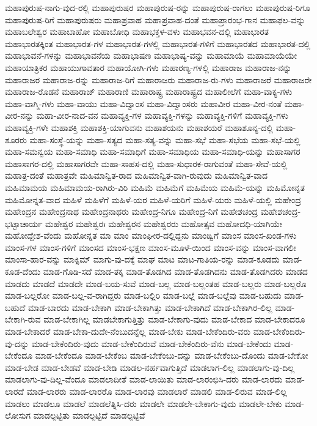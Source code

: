 {ಮಹಾಪುರುಷ-ನಾಗು-ವುದ-ರಲ್ಲಿ
ಮಹಾಪುರುಷರ
ಮಹಾಪುರುಷ-ರನ್ನು
ಮಹಾಪುರುಷ-ರಾಗಲು
ಮಹಾಪುರುಷ-ರಿಗೂ
ಮಹಾಪುರುಷ-ರಿಗೆ
ಮಹಾಪುರುಷರು
ಮಹಾಪ್ರವಾಹ
ಮಹಾಪ್ರವಾಹ-ದಂತೆ
ಮಹಾಪ್ರಾರಂಭ-ಗಾನ
ಮಹಾಫಲ-ವನ್ನು
ಮಹಾಬಲೇಶ್ವರ
ಮಹಾಬಾಹೋ
ಮಹಾಬೋಧಿ
ಮಹಾಭಕ್ತಳ-ವಳು
ಮಹಾಭವನ-ದಲ್ಲಿ
ಮಹಾಭಾರತ
ಮಹಾಭಾರತಕ್ಕಿಂತ
ಮಹಾಭಾರತ-ಗಳ
ಮಹಾಭಾರತ-ಗಳಲ್ಲಿ
ಮಹಾಭಾರತ-ಗಳಿಗೆ
ಮಹಾಭಾರತದ
ಮಹಾಭಾರತ-ದಲ್ಲಿ
ಮಹಾಭಾವನೆ-ಗಳನ್ನು
ಮಹಾಭಾವನೆಯ
ಮಹಾಭಾಷಣ
ಮಹಾಭಾಷ್ಯ-ವನ್ನು
ಮಹಾಮಾಯೆ
ಮಹಾಮಾಯೆಯೇ
ಮಹಾಯಾತ್ರಿಕರ
ಮಹಾಯುಗಾವತಾರ
ಮಹಾಯೋಗಿ-ಗಳು
ಮಹಾರಣ್ಯ-ಗಳಲ್ಲಿ
ಮಹಾರಾಜ
ಮಹಾರಾಜ-ನನ್ನು
ಮಹಾರಾಜರ
ಮಹಾರಾಜ-ರನ್ನು
ಮಹಾರಾಜ-ರಿಗೆ
ಮಹಾರಾಜರು
ಮಹಾರಾಜ-ರು-ಗಳು
ಮಹಾರಾಜರೆ
ಮಹಾರಾಜರೇ
ಮಹಾರಾಜ-ರೊಡನೆ
ಮಹಾರಾಜ್
ಮಹಾರಾಣಿ
ಮಹಾರಾಷ್ಟ್ರ
ಮಹಾರಾಷ್ಟ್ರದ
ಮಹಾಲೀಲೆಗೆ
ಮಹಾ-ವಾಕ್ಯ-ಗಳು
ಮಹಾ-ವಾಗ್ಮಿ-ಗಳು
ಮಹಾ-ವಾಯು
ಮಹಾ-ವಿದ್ವಾಂಸ
ಮಹಾ-ವಿದ್ವಾಂಸರು
ಮಹಾವೀರ
ಮಹಾ-ವೀರ-ನಂತೆ
ಮಹಾ-ವೀರ-ನನ್ನು
ಮಹಾ-ವೀರ-ನಾದ-ವನ
ಮಹಾವ್ಯಕ್ತಿ-ಗಳ
ಮಹಾವ್ಯಕ್ತಿ-ಗಳನ್ನು
ಮಹಾವ್ಯಕ್ತಿ-ಗಳಿಗೆ
ಮಹಾವ್ಯಕ್ತಿ-ಗಳು
ಮಹಾವ್ಯಕ್ತಿ-ಗಳೇ
ಮಹಾಶಕ್ತಿ
ಮಹಾಶಕ್ತಿ-ಯಾಗುವನು
ಮಹಾಶಯನು
ಮಹಾಶಯರೆ
ಮಹಾಶೂನ್ಯ-ದಲ್ಲಿ
ಮಹಾ-ಶೂರರು
ಮಹಾ-ಸಂಸ್ಥೆ-ಯನ್ನು
ಮಹಾ-ಸತ್ಯದ
ಮಹಾ-ಸತ್ಯ-ವನ್ನು
ಮಹಾ-ಸಭೆ
ಮಹಾ-ಸಭೆಯ
ಮಹಾ-ಸಭೆ-ಯಲ್ಲಿ
ಮಹಾ-ಸಮನ್ವಯ
ಮಹಾ-ಸಮಾಧಿ
ಮಹಾ-ಸಮಾಧಿಗೆ
ಮಹಾ-ಸಮಾಧಿಯ
ಮಹಾ-ಸಮಾಧಿ-ಯನ್ನು
ಮಹಾಸಾಗರ
ಮಹಾಸಾಗರ-ದಲ್ಲಿ
ಮಹಾಸಾಗರವೇ
ಮಹಾ-ಸಾಹಸ-ದಲ್ಲಿ
ಮಹಾ-ಸುಧಾರಕ-ರಾಗುವಂತೆ
ಮಹಾ-ಸೇವೆ-ಯಲ್ಲಿ
ಮಹಾತ್ರ-ದಂತೆ
ಮಹಾತ್ರವೇ
ಮಹಿಮಾನ್ವಿತ-ರಾದ
ಮಹಿಮಾನ್ವಿತ-ವಾಗಿ-ರುವುದು
ಮಹಿಮಾನ್ವಿತ-ವಾದ
ಮಹಿಮಾಮಯ
ಮಹಿಮಾಮಯ-ರಾಗಿರು-ವಿರಿ
ಮಹಿಮೆ
ಮಹಿಮೆಗೆ
ಮಹಿಮೆಯ
ಮಹಿಮೆ-ಯನ್ನು
ಮಹಿಮೋನ್ನತ
ಮಹಿಮೋನ್ನತ-ವಾದ
ಮಹಿಳೆ
ಮಹಿಳೆಗೆ
ಮಹಿಳೆ-ಯರ
ಮಹಿಳೆ-ಯರಿಗೆ
ಮಹಿಳೆ-ಯರು
ಮಹಿಳೆ-ಯಲ್ಲಿ
ಮಹೇಂದ್ರ
ಮಹೇಂದ್ರನ
ಮಹೇಂದ್ರನಾಥ
ಮಹೇಂದ್ರನಾಥರು
ಮಹೇಂದ್ರ-ನಿಗೂ
ಮಹೇಂದ್ರ-ನಿಗೆ
ಮಹೇಶಚಂದ್ರ
ಮಹೇಶಚಂದ್ರ-ಭಟ್ಟಾಚಾರ್ಯ
ಮಹೇಶ್ವರ
ಮಹೇಶ್ವರಃ
ಮಹೇಶ್ವರನ
ಮಹೇಶ್ವರರು
ಮಹೋತ್ಸವ
ಮಹೋದಧಿ-ಯಾಗಿಯೇ
ಮಹೋದ್ದೇಶ-ವೆಂದು
ಮಹೋನ್ನತ
ಮಾ
ಮಾಂ
ಮಾಂಘೀರ-ದಲ್ಲಿದ್ದನು
ಮಾಂಡ್ವಿಗೆ
ಮಾಂಸ
ಮಾಂಸ-ಖಂಡ-ಗಳು
ಮಾಂಸ-ಗಳ
ಮಾಂಸ-ಗಳಿಗೆ
ಮಾಂಸದ
ಮಾಂಸ-ಭಕ್ಷಣ
ಮಾಂಸ-ಮೂಳೆ-ಯಿಂದ
ಮಾಂಸ-ವನ್ನು
ಮಾಂಸ-ವಾಗಲೀ
ಮಾಂಸಾ-ಹಾರ-ವನ್ನು
ಮಾಕ್ಸಿಮ್
ಮಾಗು-ವು-ದಕ್ಕೆ
ಮಾಘ
ಮಾಟ
ಮಾಟ-ಗಾತಿಯ-ರನ್ನು
ಮಾಡ-ಕೂಡದು
ಮಾಡ-ಕೂಡ-ದೆಂದು
ಮಾಡ-ಗೊಡಿ-ಸದೆ
ಮಾಡ-ತಕ್ಕ
ಮಾಡ-ತೊಡಗಿದ
ಮಾಡ-ತೊಡಗಿದನು
ಮಾಡ-ತೊಡಗಿದರು
ಮಾಡದ
ಮಾಡದು
ಮಾಡದೆ
ಮಾಡದೇ
ಮಾಡ-ಬಯ-ಸುವೆ
ಮಾಡ-ಬಲ್ಲ
ಮಾಡ-ಬಲ್ಲಂತಹ
ಮಾಡ-ಬಲ್ಲರು
ಮಾಡ-ಬಲ್ಲರೊ
ಮಾಡ-ಬಲ್ಲರೋ
ಮಾಡ-ಬಲ್ಲ-ವ-ರಾಗಿದ್ದರು
ಮಾಡ-ಬಲ್ಲಿರಿ
ಮಾಡ-ಬಲ್ಲೆ
ಮಾಡ-ಬಲ್ಲೆವು
ಮಾಡ-ಬಹುದು
ಮಾಡ-ಬಹುದೆ
ಮಾಡ-ಬಾರದು
ಮಾಡ-ಬೇಕಾಗಿ
ಮಾಡ-ಬೇಕಾಗಿತ್ತು
ಮಾಡ-ಬೇಕಾಗಿದೆ
ಮಾಡ-ಬೇಕಾಗಿರ-ಲಿಲ್ಲ
ಮಾಡ-ಬೇಕಾಗಿ-ರುವ
ಮಾಡ-ಬೇಕಾಗಿಲ್ಲ
ಮಾಡಬೇಕಾಗುತ್ತಿತ್ತು
ಮಾಡ-ಬೇಕಾಗು-ವುದು
ಮಾಡ-ಬೇಕಾದ
ಮಾಡ-ಬೇಕಾದರೂ
ಮಾಡ-ಬೇಕಾದರೆ
ಮಾಡ-ಬೇಕಾ-ದುದೇ-ನೆಂಬುದನ್ನೆಲ್ಲ
ಮಾಡ-ಬೇಕು
ಮಾಡ-ಬೇಕೆಂದಿರು-ವರು
ಮಾಡ-ಬೇಕೆಂದಿರು-ವು-ದನ್ನು
ಮಾಡ-ಬೇಕೆಂದಿರು-ವುದು
ಮಾಡ-ಬೇಕೆಂದಿರುವೆ
ಮಾಡ-ಬೇಕೆಂದಿರು-ವೆನು
ಮಾಡ-ಬೇಕೆಂದು
ಮಾಡ-ಬೇಕೆಂದೂ
ಮಾಡ-ಬೇಕೆಂದೂ
ಮಾಡ-ಬೇಕೆಂಬ
ಮಾಡ-ಬೇಕೆಂಬು-ದನ್ನು
ಮಾಡ-ಬೇಕೆಂಬು-ದೊಂದು
ಮಾಡ-ಬೇಕೋ
ಮಾಡ-ಬೇಡ
ಮಾಡ-ಬೇಡವೆ
ಮಾಡ-ಬೇಡಿ
ಮಾಡಲ-ನರ್ಹವಾಗುತ್ತಿದೆ
ಮಾಡಲಾಗ-ಲಿಲ್ಲ
ಮಾಡಲಾಗು-ವು-ದಿಲ್ಲ
ಮಾಡಲಾಗು-ವು-ದಿಲ್ಲ-ವೆಂದೂ
ಮಾಡಲಾದೀತೆ
ಮಾಡ-ಲಾಯಿತು
ಮಾಡ-ಲಾರಂಭಿಸಿ-ದರು
ಮಾಡ-ಲಾರದು
ಮಾಡ-ಲಾರದೆ
ಮಾಡ-ಲಾರರು
ಮಾಡ-ಲಾರರೊ
ಮಾಡ-ಲಾರವು
ಮಾಡಲಾರೆ
ಮಾಡಲಿ
ಮಾಡ-ಲಿರುವ
ಮಾಡ-ಲಿಲ್ಲ
ಮಾಡಲು
ಮಾಡಲೂ
ಮಾಡಲೆ
ಮಾಡಲೆತ್ನಿಸಿ-ದರು
ಮಾಡಲೇ
ಮಾಡಲೇ-ಬೇಕಾಗು-ವುದು
ಮಾಡಲೇ-ಬೇಕು
ಮಾಡ-ಲೋಸುಗ
ಮಾಡಲ್ಪಟ್ಟಿತು
ಮಾಡಲ್ಪಟ್ಟಿದೆ
ಮಾಡಲ್ಪಟ್ಟಿವೆ
}
